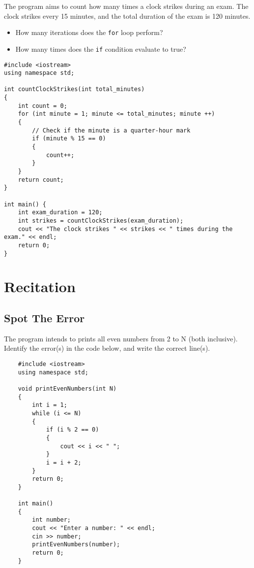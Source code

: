 \begin{problem}
    The program aims to count how many times a clock strikes during an exam. The clock strikes every 15 minutes, and the total duration of the exam is 120 minutes.

    \begin{itemize}
        \item How many iterations does the \texttt{for} loop perform?
        \item How many times does the \texttt{if} condition evaluate to true?
    \end{itemize}

    \begin{verbatim}
#include <iostream>
using namespace std;

int countClockStrikes(int total_minutes)
{
    int count = 0;
    for (int minute = 1; minute <= total_minutes; minute ++)
    {
        // Check if the minute is a quarter-hour mark
        if (minute % 15 == 0)
        {
            count++;
        }
    }
    return count;
}

int main() {
    int exam_duration = 120;
    int strikes = countClockStrikes(exam_duration);
    cout << "The clock strikes " << strikes << " times during the exam." << endl;
    return 0;
}
    \end{verbatim}
\end{problem}


\section{Recitation}

\subsection{Spot The Error}
\begin{multipart}
The program intends to prints all even numbers from 2 to N (both inclusive). Identify the error(s) in the code below, and write the correct line(s).
\end{multipart}

\begin{verbatim}
    #include <iostream>
    using namespace std;
    
    void printEvenNumbers(int N)
    {
        int i = 1;   
        while (i <= N)
        {
            if (i % 2 == 0)
            {
                cout << i << " ";
            }
            i = i + 2;
        }
        return 0;
    }
    
    int main()
    {
        int number;
        cout << "Enter a number: " << endl;
        cin >> number;
        printEvenNumbers(number);
        return 0;
    }
\end{verbatim}

